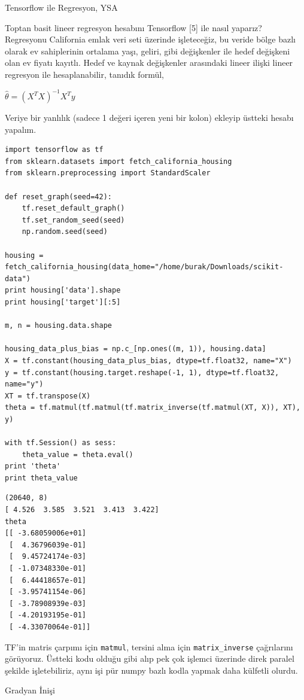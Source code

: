 \documentclass[12pt,fleqn]{article}\usepackage{../../common}
\begin{document}
Tensorflow ile Regresyon, YSA

Toptan basit lineer regresyon hesabını Tensorflow [5] ile nasıl yaparız?
Regresyonu California emlak veri seti üzerinde işleteceğiz, bu veride bölge
bazlı olarak ev sahiplerinin ortalama yaşı, geliri, gibi değişkenler ile hedef
değişkeni olan ev fiyatı kayıtlı. Hedef ve kaynak değişkenler arasındaki lineer
ilişki lineer regresyon ile hesaplanabilir, tanıdık formül,

$\hat{\theta} = (X^TX )^{-1} X^T y $

Veriye bir yanlılık (sadece 1 değeri içeren yeni bir kolon) ekleyip üstteki
hesabı yapalım.

\begin{verbatim}
import tensorflow as tf
from sklearn.datasets import fetch_california_housing
from sklearn.preprocessing import StandardScaler

def reset_graph(seed=42):
    tf.reset_default_graph()
    tf.set_random_seed(seed)
    np.random.seed(seed)

housing = fetch_california_housing(data_home="/home/burak/Downloads/scikit-data")
print housing['data'].shape
print housing['target'][:5]

m, n = housing.data.shape

housing_data_plus_bias = np.c_[np.ones((m, 1)), housing.data]
X = tf.constant(housing_data_plus_bias, dtype=tf.float32, name="X")
y = tf.constant(housing.target.reshape(-1, 1), dtype=tf.float32, name="y")
XT = tf.transpose(X)
theta = tf.matmul(tf.matmul(tf.matrix_inverse(tf.matmul(XT, X)), XT), y)

with tf.Session() as sess:
    theta_value = theta.eval()
print 'theta'
print theta_value
\end{verbatim}

\begin{verbatim}
(20640, 8)
[ 4.526  3.585  3.521  3.413  3.422]
theta
[[ -3.68059006e+01]
 [  4.36796039e-01]
 [  9.45724174e-03]
 [ -1.07348330e-01]
 [  6.44418657e-01]
 [ -3.95741154e-06]
 [ -3.78908939e-03]
 [ -4.20193195e-01]
 [ -4.33070064e-01]]
\end{verbatim}

TF'in matris çarpımı için \verb!matmul!, tersini alma için
\verb!matrix_inverse! çağrılarını görüyoruz. Üstteki kodu olduğu gibi alıp
pek çok işlemci üzerinde direk paralel şekilde işletebiliriz, aynı işi pür
numpy bazlı kodla yapmak daha külfetli olurdu.

Gradyan İnişi
\end{document}
